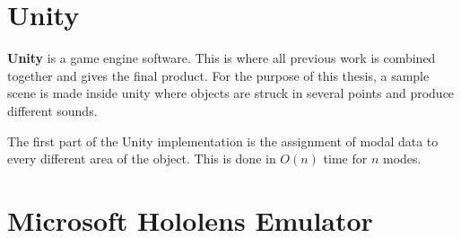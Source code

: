 \section{Unity\textregistered}
\textbf{Unity\textregistered} is a game engine software. This is where all previous work is combined together and gives the final product. For the purpose of this thesis, a sample scene is made inside unity where objects are struck in several points and produce different sounds. 

The first part of the Unity implementation is the assignment of modal data to every different area of the object. This is done in $O(n)$ time for $n$ modes. 


\section{Microsoft Hololens Emulator}

